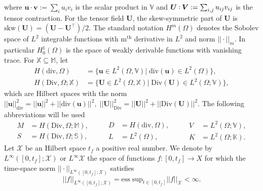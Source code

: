 \documentclass{ifacconf}
\def\onedot{$\mathsurround0pt\ldotp$}
\def\cddot{%
	\mathbin{\vcenter{\baselineskip.67ex
			\hbox{\onedot}\hbox{\onedot}}%
}}
\begin{document}
where $\bm{u} \cdot \bm{v} := \sum_{i} u_{i} v_{i}$ is the scalar product in $\mathbb{V}$ and $\bm{U} \cddot \bm{V} := \sum_{i,j} u_{ij} v_{ij}$ is the tensor contraction.
For the tensor field $\bm{U}$, the skew-symmetric part of $\bm{U}$ is $\mathrm{skw}(\bm{U}) = (\bm{U} - \bm{U}^\top)/2$. The standard notation $H^m(\Omega)$ denotes the Sobolev space of $L^2$ integrable functions with  m$^\text{th}$ derivative in $L^2$ and norm $||\cdot||_m$. In particular $H^1_0(\Omega)$ is the space of weakly derivable functions with vanishing trace. For $\mathbb{X} \subseteq \mathbb{M}$, let
\begin{equation*}
\begin{aligned}
H(\mathrm{div}, \Omega) &= \{\bm{u} \in L^2(\Omega, \mathbb{V}) \vert \; \mathrm{div}(\bm{u}) \in L^2(\Omega) \}, \\
H(\mathrm{Div}, \Omega; \mathbb{X}) &= \{\bm{U} \in L^2(\Omega, \mathbb{X}) \vert \; \mathrm{Div}(\bm{U}) \in L^2(\Omega; \mathbb{V}) \},
\end{aligned}
\end{equation*}
which are Hilbert spaces with the norm $||\bm{u}||^2_{\text{div}} = ||\bm{u}||^2 + ||\mathrm{div}(\bm{u})||^2, \; ||\bm{U}||^2_{\text{Div}} = ||\bm{U}||^2 + ||\mathrm{Div}(\bm{U})||^2$. The following abbreviations will be used
\begin{equation*}
\begin{aligned}
M &= H(\mathrm{Div}, \Omega; \mathbb{M}), \\
S &= H(\mathrm{Div}, \Omega; \mathbb{S}),
\end{aligned} \qquad
\begin{aligned}
D &= H(\mathrm{div}, \Omega), \\
L &= L^2(\Omega),
\end{aligned} \qquad
\begin{aligned}
V &= L^2(\Omega; \mathbb{V}), \\
K &= L^2(\Omega; \mathbb{K}).
\end{aligned}
\end{equation*}
Let $\mathcal{X}$ be an Hilbert space $t_f$ a positive real number. We denote by $L^\infty([0, t_f]; \mathcal{X})$ or $L^\infty \mathcal{X}$ the space of functions $f: [0, t_f] \rightarrow X$ for which the time-space norm $||\cdot||_{L^\infty([0, t_f]; \mathcal{X})}$ satisfies
\[
||f||_{L^\infty([0, t_f]; \mathcal{X})} = \mathrm{ess \; sup}_{t \in [0,t_f]} ||f||_{\mathcal{X}} < \infty.
\]
\end{document}
